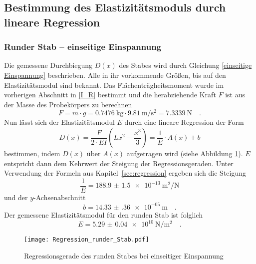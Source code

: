 \subsection{Bestimmung des Elastizitätsmoduls durch lineare Regression}
\subsubsection{Runder Stab -- einseitige Einspannung}
Die gemessene Durchbiegung $D(x)$ des Stabes wird durch Gleichung \eqref{einseitige Einspannung} beschrieben.
Alle in ihr vorkommende Größen, bis auf den Elastizitätsmodul sind bekannt. Das Flächenträgheitsmoment wurde im vorherigen Abschnitt in \eqref{I_R} bestimmt und die herabziehende Kraft $F$ ist aus der Masse des Probekörpers zu berechnen
\begin{equation}
  F = m \cdot g = \SI{0.7476}{\kilo\gram} \cdot \SI{9.81}{\metre\per\second\squared} = \SI{7.3339}{\newton} \quad .
\end{equation}
Nun lässt sich der Elastizitätsmodul $E$ durch eine lineare Regression der Form
\begin{equation}
  D(x) = \frac{F}{2\cdot E I}\left(Lx^2-\frac{x^3}{3}\right) = \frac{1}{E} \cdot A(x) +b
\end{equation}
bestimmen, indem $D(x)$ über $A(x)$ aufgetragen wird (siehe Abbildung \ref{fig:Regression_runder_Stab}). $E$ entspricht dann dem Kehrwert der Steigung der Regressionsgeraden. Unter Verwendung der Formeln aus Kapitel~\ref{sec:regression} ergeben sich die Steigung
\begin{equation}
  \frac{1}{E}= \SI{188.9(15)e-13}{\metre\squared\per\newton}
\end{equation}
und der $y$-Achsenabschnitt
\begin{equation}
  b = \SI{14.33(36)e-05}{\metre} \quad.
\end{equation}
Der gemessene Elastizitätsmodul für den runden Stab ist folglich
\begin{equation}
  E = \SI{5.29(4)e+10}{\newton\per\metre\squared} \quad.
\end{equation}

\begin{figure}
\centering
\texttt{[image: Regression\_runder\_Stab.pdf]}
\caption{Regressionsgerade des runden Stabes bei einseitiger Einspannung}
\label{fig:Regression_runder_Stab}
\end{figure}




